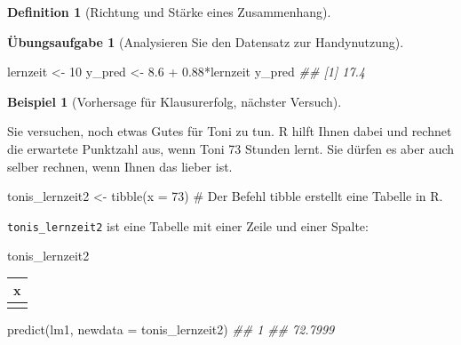 \documentclass[
  a4paper,
  DIV=11]{scrreprt}
\newenvironment{Shaded}{\begin{snugshade}}{\end{snugshade}}
\newcommand{\AttributeTok}[1]{\textcolor[rgb]{0.40,0.45,0.13}{#1}}
\newcommand{\CommentTok}[1]{\textcolor[rgb]{0.37,0.37,0.37}{#1}}
\newcommand{\DecValTok}[1]{\textcolor[rgb]{0.68,0.00,0.00}{#1}}
\newcommand{\DocumentationTok}[1]{\textcolor[rgb]{0.37,0.37,0.37}{\textit{#1}}}
\newcommand{\FloatTok}[1]{\textcolor[rgb]{0.68,0.00,0.00}{#1}}
\newcommand{\FunctionTok}[1]{\textcolor[rgb]{0.28,0.35,0.67}{#1}}
\newcommand{\NormalTok}[1]{\textcolor[rgb]{0.00,0.23,0.31}{#1}}
\newcommand{\OtherTok}[1]{\textcolor[rgb]{0.00,0.23,0.31}{#1}}
\newcommand{\SpecialCharTok}[1]{\textcolor[rgb]{0.37,0.37,0.37}{#1}}
\theoremstyle{definition}
\newtheorem{exercise}{Übungsaufgabe}[chapter]
\theoremstyle{definition}
\newtheorem{example}{Beispiel}[chapter]
\theoremstyle{definition}
\newtheorem{definition}{Definition}[chapter]
\theoremstyle{remark}
\begin{document}
\begin{definition}[Richtung und Stärke eines
Zusammenhang]
\begin{exercise}[Analysieren Sie den Datensatz zur
Handynutzung]
\begin{Shaded}
\begin{Highlighting}[]
\NormalTok{lernzeit }\OtherTok{\textless{}{-}} \DecValTok{10}
\NormalTok{y\_pred }\OtherTok{\textless{}{-}} \FloatTok{8.6} \SpecialCharTok{+} \FloatTok{0.88}\SpecialCharTok{*}\NormalTok{lernzeit}
\NormalTok{y\_pred}
\DocumentationTok{\#\# [1] 17.4}
\end{Highlighting}
\end{Shaded}

\begin{example}[Vorhersage für Klausurerfolg, nächster
Versuch]\protect\hypertarget{exm-noten6}{}\label{exm-noten6}

Sie versuchen, noch etwas Gutes für Toni zu tun. R hilft Ihnen dabei und
rechnet die erwartete Punktzahl aus, wenn Toni 73 Stunden lernt. Sie
dürfen es aber auch selber rechnen, wenn Ihnen das lieber ist.

\end{example}

\begin{Shaded}
\begin{Highlighting}[]
\NormalTok{tonis\_lernzeit2 }\OtherTok{\textless{}{-}} \FunctionTok{tibble}\NormalTok{(}\AttributeTok{x =} \DecValTok{73}\NormalTok{)  }\CommentTok{\# Der Befehl \textasciigrave{}tibble\textasciigrave{} erstellt eine Tabelle in R.}
\end{Highlighting}
\end{Shaded}

\texttt{tonis\_lernzeit2} ist eine Tabelle mit einer Zeile und einer
Spalte:

\begin{Shaded}
\begin{Highlighting}[]
\NormalTok{tonis\_lernzeit2}
\end{Highlighting}
\end{Shaded}

\begin{longtable}[]{@{}r@{}}
\toprule\noalign{}
x \\
\midrule\noalign{}
\endhead
\bottomrule\noalign{}
\endlastfoot
73 \\
\end{longtable}

\begin{Shaded}
\begin{Highlighting}[]
\FunctionTok{predict}\NormalTok{(lm1, }\AttributeTok{newdata =}\NormalTok{ tonis\_lernzeit2)}
\DocumentationTok{\#\#       1 }
\DocumentationTok{\#\# 72.7999}
\end{Highlighting}
\end{Shaded}


\end{exercise}
\end{definition}
\end{document}
